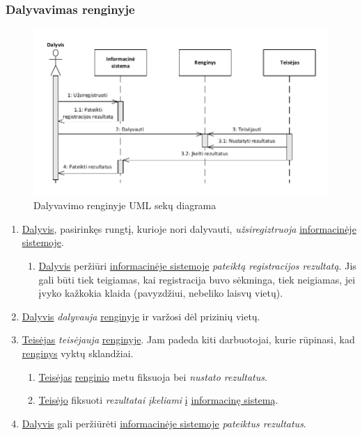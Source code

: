 \documentclass{VUMIFPSkursinis}
\begin{document}
    \subsubsection*{Dalyvavimas renginyje}
	    \begin{figure}[H]
        \centering
        \includegraphics[width=\textwidth]{img/ScenarijausSekuDiagrama2}
        \caption{Dalyvavimo renginyje UML sekų diagrama}
        \label{fig:scenarijusDalyvavimoSekuDiagrama}
      \end{figure}
      
      \begin{enumerate}
        \item  \underline{Dalyvis}, pasirinkęs rungtį, kurioje nori dalyvauti, \textit{užsiregiztruoja} \underline{informacinėje sistemoje}.
          \begin{enumerate}
            \item \underline{Dalyvis} peržiūri \underline{informacinėje sistemoje}  \textit{pateiktą registracijos rezultatą}. Jis gali būti tiek teigiamas, kai
                  registracija buvo sėkminga, tiek neigiamas, jei įvyko kažkokia klaida (pavyzdžiui, nebeliko laisvų vietų).
          \end{enumerate}
        \item \underline{Dalyvis} \textit{dalyvauja} \underline{renginyje} ir varžosi dėl prizinių vietų.
        \item \underline{Teisėjas} \textit{teisėjauja} \underline{renginyje}. Jam padeda kiti darbuotojai, kurie rūpinasi, kad \underline{renginys} vyktų sklandžiai. 
          \begin{enumerate}
            \item \underline{Teisėjas} \underline{renginio} metu fiksuoja bei  \textit{nustato rezultatus}.
            \item  \underline{Teisėjo} fiksuoti  \textit{rezultatai įkeliami} į \underline{informacinę sistemą}.
          \end{enumerate}
        \item \underline{Dalyvis} gali peržiūrėti \underline{informacinėje sistemoje}  \textit{pateiktus rezultatus}. 
      \end{enumerate}
      
\end{document}
